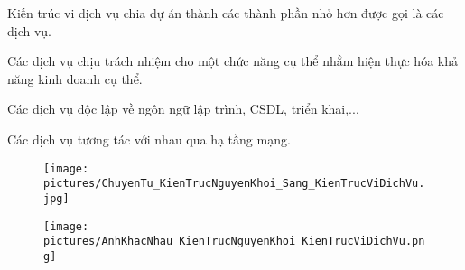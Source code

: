 Kiến trúc vi dịch vụ chia dự án thành các thành phần nhỏ hơn được gọi là các dịch vụ.

Các dịch vụ chịu trách nhiệm cho một chức năng cụ thể nhằm hiện thực hóa khả năng kinh doanh cụ thể.

Các dịch vụ độc lập về ngôn ngữ lập trình, CSDL, triển khai,...

Các dịch vụ tương tác với nhau qua hạ tầng mạng.

\begin{figure}[h]
\centering
\texttt{[image: pictures/ChuyenTu\_KienTrucNguyenKhoi\_Sang\_KienTrucViDichVu.jpg]}
\end{figure}

\begin{figure}[h]
\centering
\texttt{[image: pictures/AnhKhacNhau\_KienTrucNguyenKhoi\_KienTrucViDichVu.png]}
\end{figure}
